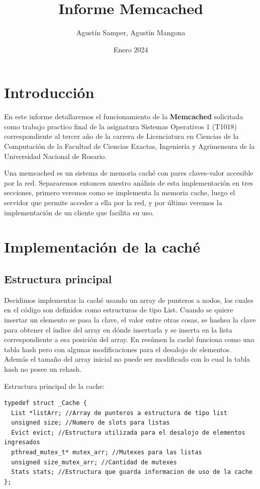 \documentclass{article}
\title{Informe Memcached}
\author{Agustín Samper, Agustín Mangona}
\date{Enero 2024}
\begin{document}
\maketitle
\newpage
\tableofcontents
\newpage
{}
\section*{Introducción}
  En este informe detallaremos el funcionamiento de la \textbf{Memcached} solicitada como trabajo practico final de la asignatura Sistemas Operativos 1 (T1018) correspondiente al tercer año de la carrera de Licenciatura en Ciencias de la Computación de la Facultad de Ciencias Exactas, Ingeniería y Agrimensura de la Universidad Nacional de Rosario.
    
  Una memcached es un sistema de memoria caché con pares claves-valor accesible por la red. Separaremos entonces nuestro análisis de esta implementación en tres secciones, primero veremos como se implementa la memoria cache, luego el servidor que permite acceder a ella por la red, y por último veremos la implementación de un cliente que facilita su uso.
\newpage
\section{Implementación de la caché}
\subsection{Estructura principal}
Decidimos implementar la caché usando un array de punteros
a nodos, los cuales en el código son definidos como estructuras
de tipo List. Cuando se quiere insertar un elemento se pasa
la clave, el valor entre otras cosas, se hashea
la clave para obtener el índice del array en dónde insertarla
y se inserta en la lista correspondiente a esa posición
del array. En resúmen la caché funciona como una tabla
hash pero con algunas modificaciones para el desalojo de
elementos. Además el tamaño del array inicial no puede
ser modificado con lo cual la tabla hash no posee un rehash.

Estructura principal de la cache:
\begin{lstlisting}[style=CStyle]
typedef struct _Cache {
  List *listArr; //Array de punteros a estructura de tipo list 
  unsigned size; //Numero de slots para listas
  Evict evict; //Estructura utilizada para el desalojo de elementos ingresados
  pthread_mutex_t* mutex_arr; //Mutexes para las listas
  unsigned size_mutex_arr; //Cantidad de mutexes
  Stats stats; //Estructura que guarda informacion de uso de la cache
}; 
\end{lstlisting}
\end{document}
